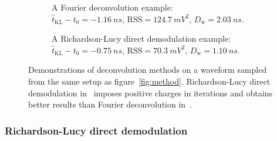 \begin{figure}[H]
  \begin{subfigure}{0.5\textwidth}
    \centering
    \resizebox{\textwidth}{!}{}
    \caption{\label{fig:fd} A Fourier deconvolution example: \\ $\hat{t}_\mathrm{KL} - t_0=\SI{-1.16}{ns}$, $\mathrm{RSS}=\SI{124.7}{mV^2}$, $D_\mathrm{w}=\SI{2.03}{ns}$.}
  \end{subfigure}
  \begin{subfigure}{0.5\textwidth}
    \centering
    \resizebox{\textwidth}{!}{}
    \caption{\label{fig:lucy} A Richardson-Lucy direct demodulation example:\\ $\hat{t}_\mathrm{KL} - t_0=\SI{-0.75}{ns}$, $\mathrm{RSS}=\SI{70.3}{mV^2}$, $D_\mathrm{w}=\SI{1.10}{ns}$.}
  \end{subfigure}
  \caption{\label{fig:deconv}Demonstrations of deconvolution methods on a waveform sampled from the same setup as figure~\ref{fig:method}. Richardson-Lucy direct demodulation in~ imposes positive charges in iterations and obtains better results than Fourier deconvolution in~.}
\end{figure}

\subsubsection{Richardson-Lucy direct demodulation}
\label{sec:lucyddm}

